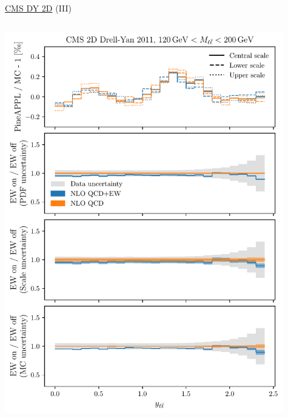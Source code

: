 \begin{frame}{\href{https://arxiv.org/abs/1412.1115}{CMS DY 2D} (III)}
\fontsize{9}{11}\selectfont
\begin{columns}
\begin{column}{0.5\textwidth}
\includegraphics[width=0.95\textwidth]{ew_corrections/figures/pineappl_CMSDY2D11_bin5}
\end{column}
\begin{column}{0.5\textwidth}

\end{column}
\end{columns}
\end{frame}
